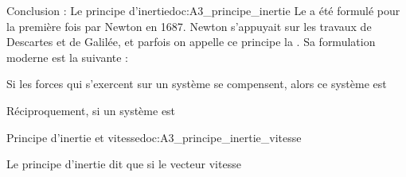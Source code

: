 \begin{doc}{Conclusion : Le principe d'inertie}{doc:A3_principe_inertie}
  \chevron Le  a été formulé pour la première fois par Newton en 1687.
  Newton s'appuyait sur les travaux de Descartes et de Galilée, et parfois on appelle ce principe la .
  Sa formulation moderne est la suivante :
  
  \begin{encart}
    Si les forces qui s'exercent sur un système se compensent, alors ce système est 
  \end{encart}
  
  \begin{encart}
    Réciproquement, si un système est
  \end{encart}
\end{doc}



\begin{doc}{Principe d'inertie et vitesse}{doc:A3_principe_inertie_vitesse}
  \begin{encart}
    Le principe d'inertie dit que si le vecteur vitesse
  \end{encart}
\end{doc}